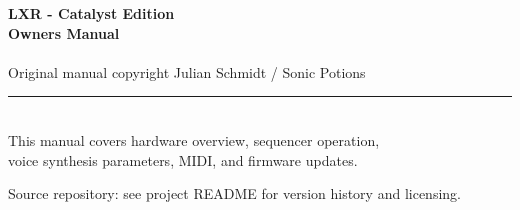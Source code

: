 
\begin{titlepage}
  \centering
  \vspace*{3cm}

  {\Huge\bfseries\color{lxrorange} LXR - Catalyst Edition}\\[0.4em]
  {\LARGE\bfseries Owners Manual}\\[2em]

  {\large\color{lxrgrey} \manualversion}\\[0.5em]
  {\normalsize\color{lxrgrey} Original manual copyright Julian Schmidt / Sonic Potions}\\[4cm]

  \textcolor{lxrorange}{\rule{0.6\linewidth}{1.5pt}}\\[3em]

  {\normalsize\color{lxrgrey}
    This manual covers hardware overview, sequencer operation,\\
    voice synthesis parameters, MIDI, and firmware updates.
  }

  \vfill

  {\small\color{lxrgrey}
    Source repository: see project README for version history and licensing.
  }
\end{titlepage}
